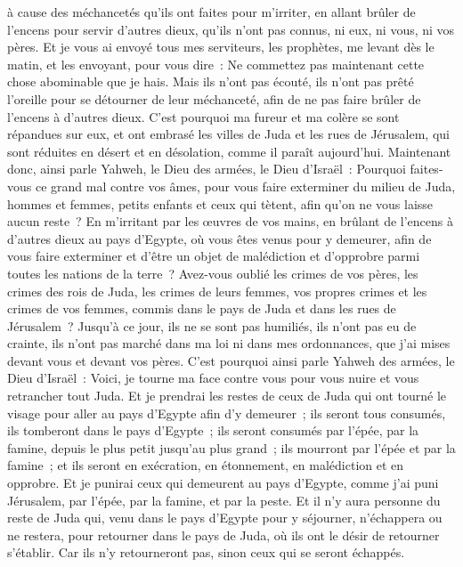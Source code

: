 \begin{multicols}{2}
à cause des méchancetés qu'ils ont faites pour m'irriter, en allant brûler de l'encens pour servir d'autres dieux, qu'ils n'ont pas connus, ni eux, ni vous, ni vos pères.
Et je vous ai envoyé tous mes serviteurs, les prophètes, me levant dès le matin, et les envoyant, pour vous dire~: Ne commettez pas maintenant cette chose abominable que je hais.
Mais ils n'ont pas écouté, ils n'ont pas prêté l'oreille pour se détourner de leur méchanceté, afin de ne pas faire brûler de l'encens à d'autres dieux.
C'est pourquoi ma fureur et ma colère se sont répandues sur eux, et ont embrasé les villes de Juda et les rues de Jérusalem, qui sont réduites en désert et en désolation, comme il paraît aujourd'hui.
Maintenant donc, ainsi parle Yahweh, le Dieu des armées, le Dieu d'Israël~: Pourquoi faites-vous ce grand mal contre vos âmes, pour vous faire exterminer du milieu de Juda, hommes et femmes, petits enfants et ceux qui tètent, afin qu'on ne vous laisse aucun reste~?
En m'irritant par les œuvres de vos mains, en brûlant de l'encens à d'autres dieux au pays d'Egypte, où vous êtes venus pour y demeurer, afin de vous faire exterminer et d'être un objet de malédiction et d'opprobre parmi toutes les nations de la terre~?
Avez-vous oublié les crimes de vos pères, les crimes des rois de Juda, les crimes de leurs femmes, vos propres crimes et les crimes de vos femmes, commis dans le pays de Juda et dans les rues de Jérusalem~?
Jusqu'à ce jour, ils ne se sont pas humiliés, ils n'ont pas eu de crainte, ils n'ont pas marché dans ma loi ni dans mes ordonnances, que j'ai mises devant vous et devant vos pères.
C'est pourquoi ainsi parle Yahweh des armées, le Dieu d'Israël~: Voici, je tourne ma face contre vous pour vous nuire et vous retrancher tout Juda.
Et je prendrai les restes de ceux de Juda qui ont tourné le visage pour aller au pays d'Egypte afin d'y demeurer~; ils seront tous consumés, ils tomberont dans le pays d'Egypte~; ils seront consumés par l'épée, par la famine, depuis le plus petit jusqu'au plus grand~; ils mourront par l'épée et par la famine~; et ils seront en exécration, en étonnement, en malédiction et en opprobre.
Et je punirai ceux qui demeurent au pays d'Egypte, comme j'ai puni Jérusalem, par l'épée, par la famine, et par la peste.
Et il n'y aura personne du reste de Juda qui, venu dans le pays d'Egypte pour y séjourner, n'échappera ou ne restera, pour retourner dans le pays de Juda, où ils ont le désir de retourner s'établir. Car ils n'y retourneront pas, sinon ceux qui se seront échappés.

\end{multicols}
